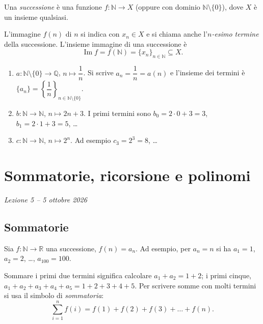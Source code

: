 \documentclass[11pt,a4paper]{article}
\begin{document}
\begin{definizione}
Una \emph{successione} è una funzione $f : \mathbb{N} \to X$ (oppure con
dominio $\mathbb{N} \setminus \{0\}$), dove $X$ è un insieme qualsiasi.
\end{definizione}

L'immagine $f(n)$ di $n$ si indica con $x_n \in X$ e si chiama anche
l'\emph{$n$-esimo termine} della successione. L'insieme immagine di una
successione è
\[
\operatorname{Im} f = f(\mathbb{N}) = \{x_n\}_{n \in \mathbb{N}}
\subseteq X.
\]

\begin{esempio}
\leavevmode
\begin{enumerate}
    \item $a : \mathbb{N} \setminus \{0\} \to \mathbb{Q}$,
          $n \mapsto \dfrac{1}{n}$. Si scrive $a_n = \dfrac{1}{n} = a(n)$
          e l'insieme dei termini è
          $\{a_n\} = \left\{\dfrac{1}{n}\right\}_{n \in \mathbb{N}
          \setminus \{0\}}$.

    \item $b : \mathbb{N} \to \mathbb{N}$, $n \mapsto 2n + 3$. I primi
          termini sono $b_0 = 2 \cdot 0 + 3 = 3$,
          $b_1 = 2 \cdot 1 + 3 = 5$, \dots

    \item $c : \mathbb{N} \to \mathbb{N}$, $n \mapsto 2^n$. Ad esempio
          $c_3 = 2^3 = 8$, \dots
\end{enumerate}
\end{esempio}

\section[Sommatorie, ricorsione e polinomi (Lezione 5 -- 5 ottobre 2026)]{Sommatorie, ricorsione e polinomi}
\noindent\emph{Lezione 5 -- 5 ottobre 2026}
\subsection{Sommatorie}

Sia $f \colon \mathbb{N} \to \mathbb{R}$ una successione, $f(n) = a_n$. Ad
esempio, per $a_n = n$ si ha $a_1 = 1$, $a_2 = 2$, \dots, $a_{100} = 100$.

Sommare i primi due termini significa calcolare $a_1 + a_2 = 1 + 2$; i primi
cinque, $a_1 + a_2 + a_3 + a_4 + a_5 = 1 + 2 + 3 + 4 + 5$. Per scrivere somme
con molti termini si usa il simbolo di \emph{sommatoria}:
\[
\sum_{i=1}^{n} f(i) = f(1) + f(2) + f(3) + \dots + f(n).
\]
\end{document}

